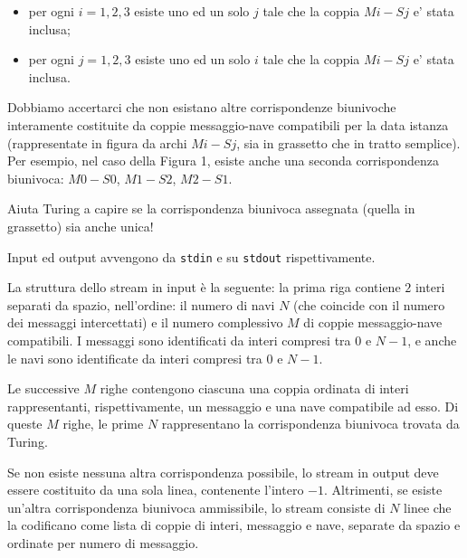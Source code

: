 \begin{itemize}
  
    \item  per ogni $i=1,2,3$ esiste uno ed un solo $j$ tale che la coppia $Mi-Sj$ e' stata inclusa;
    \item  per ogni $j=1,2,3$ esiste uno ed un solo $i$ tale che la coppia $Mi-Sj$ e' stata inclusa.
\end{itemize}


    Dobbiamo accertarci che non esistano altre corrispondenze biunivoche interamente costituite da coppie messaggio-nave compatibili per la data istanza (rappresentate in figura da archi $Mi-Sj$, sia in grassetto che in tratto semplice).
    Per esempio, nel caso della Figura 1, esiste anche una seconda corrispondenza biunivoca: $M0-S0$, $M1-S2$, $M2-S1$.
    
    Aiuta Turing a capire se la corrispondenza biunivoca assegnata (quella in grassetto) sia anche unica!

\newpage
{}

Input ed output avvengono da \verb'stdin' e su \verb'stdout' rispettivamente.




La struttura dello stream in input è la seguente: la prima riga contiene $2$ interi separati da spazio, nell'ordine: il numero di navi $N$ (che coincide con il numero dei messaggi intercettati) e il numero complessivo $M$ di coppie messaggio-nave compatibili. I messaggi sono identificati da interi compresi tra $0$ e $N-1$, e anche le navi sono identificate da interi compresi tra $0$ e $N-1$.

Le successive $M$ righe contengono ciascuna una coppia ordinata di interi rappresentanti, rispettivamente, un messaggio e una nave compatibile ad esso. Di queste $M$ righe, le prime $N$ rappresentano la corrispondenza biunivoca trovata da Turing.  
    

Se non esiste nessuna altra corrispondenza possibile, lo stream in output deve essere costituito da una sola linea, contenente l'intero $-1$. Altrimenti, se esiste un'altra corrispondenza biunivoca ammissibile, lo stream consiste di $N$ linee che la codificano come lista di coppie di interi, messaggio e nave, separate da spazio e ordinate per numero di messaggio.




